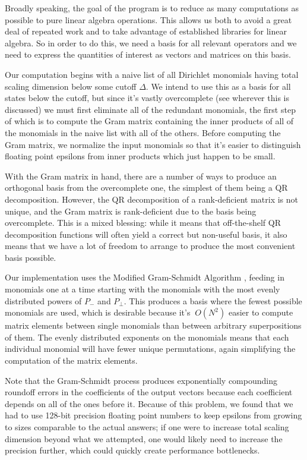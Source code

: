 {Broadly speaking, the goal of the program is to reduce as many computations as
possible to pure linear algebra operations. This allows us both to avoid a great
deal of repeated work and to take advantage of established libraries for linear
algebra. So in order to do this, we need a basis for all relevant operators and
we need to express the quantities of interest as vectors and matrices on this
basis.

Our computation begins with a naive list of all Dirichlet monomials having total 
scaling dimension below some cutoff $\Delta$. We intend to use this as a basis
for all states below the cutoff, but since it's vastly overcomplete (see
{\red wherever this is discussed}) we must first eliminate all of the redundant
monomials, the first step of which is to compute the Gram matrix containing the
inner products of all of the monomials in the naive list with all of the others.
Before computing the Gram matrix, we normalize the input monomials so that it's
easier to distinguish floating point epsilons from inner products which just 
happen to be small.

With the Gram matrix in hand, there are a number of ways to produce an 
orthogonal basis from the overcomplete one, the simplest of them being a QR
decomposition. However, the QR decomposition of a rank-deficient matrix is not
unique, and the Gram matrix is rank-deficient due to the basis being 
overcomplete. This is a mixed blessing: while it means that off-the-shelf QR
decomposition functions will often yield a correct but non-useful basis, it also
means that we have a lot of freedom to arrange to produce the most convenient
basis possible.

Our implementation uses the Modified Gram-Schmidt Algorithm 
\cite{Code:ModGramSchmidt}, feeding in monomials one at a time starting with the
monomials with the most evenly distributed powers of $P_-$ and $P_\perp$. This
produces a basis where the fewest possible monomials are used, which is 
desirable because it's $~O(N^2)$ easier to compute matrix elements between 
single monomials than between arbitrary superpositions of them. The evenly 
distributed exponents on the monomials means that each individual monomial will
have fewer unique permutations, again simplifying the computation of the matrix
elements.

Note that the Gram-Schmidt process produces exponentially compounding roundoff
errors in the coefficients of the output vectors because each coefficient 
depends on all of the ones before it. Because of this problem, we found that we
had to use 128-bit precision floating point numbers to keep epsilons from 
growing to sizes comparable to the actual answers; if one were to increase total 
scaling dimension beyond what we attempted, one would likely need to increase
the precision further, which could quickly create performance bottlenecks.

}
